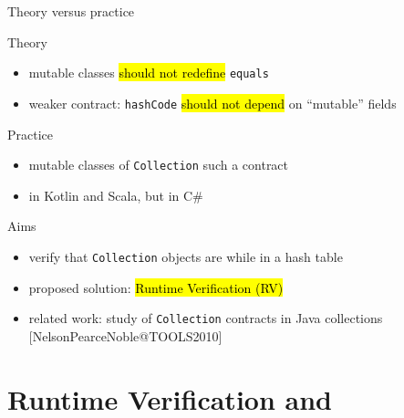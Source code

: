 \documentclass[10pt,usenames,dvipsnames]{beamer}
\begin{document}

\begin{frame}[fragile]{Theory versus practice}
  \begin{block}{Theory}
    \begin{itemize}
    \item mutable classes \hl{should not redefine} \lstinline[basicstyle=\ttfamily\normalsize]{equals}
    \item weaker contract: \lstinline[basicstyle=\ttfamily\normalsize]{hashCode} \hl{should not depend} on ``mutable'' fields
    \end{itemize}   
  \end{block}

  \begin{block}{Practice}
    \begin{itemize}
    \item mutable classes of \lstinline[basicstyle=\ttfamily\normalsize]{Collection}  such a contract 
    \item {} in Kotlin and Scala, but  in C\#
    \end{itemize}   
  \end{block}


    \begin{block}{Aims}
    \begin{itemize}
    \item verify that \lstinline{Collection} objects are  while in a hash table
    \item proposed solution: \hl{Runtime Verification (RV)}
    \item related work: study of  \lstinline[basicstyle=\ttfamily\normalsize]{Collection} contracts in Java collections
       [NelsonPearceNoble@TOOLS2010]
    \end{itemize}   
  \end{block}

\end{frame}


\section{Runtime Verification and \rml}
\end{document}
